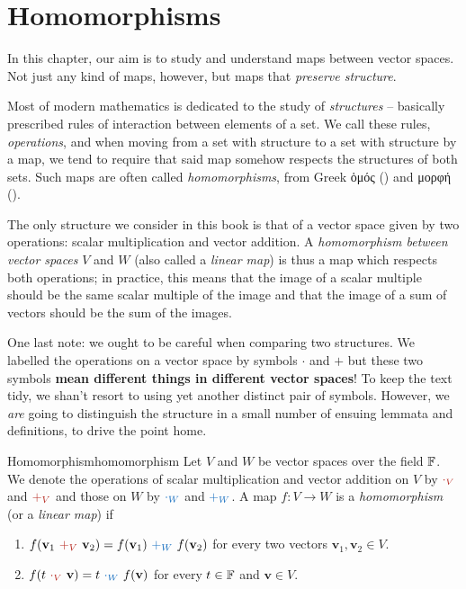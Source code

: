 \chapter{Homomorphisms}
\label{chap:homomorphisms}

In this chapter, our aim is to study and understand maps between vector spaces.
Not just any kind of maps, however, but maps that \emph{preserve structure}.

Most of modern mathematics is dedicated to the study of \emph{structures} --
basically prescribed rules of interaction between elements of a set. We call
these rules, \emph{operations}, and when moving from a set with structure to a
set with structure by a map, we tend to require that said map somehow respects
the structures of both sets. Such maps are often called \emph{homomorphisms},
from Greek ὁμός () and μορφή ().

The only structure we consider in this book is that of a vector space given by
two operations: scalar multiplication and vector addition. A \emph{homomorphism
between vector spaces} $V$ and $W$ (also called a \emph{linear map}) is thus a
map which respects both operations; in practice, this means that the image of a
scalar multiple should be the same scalar multiple of the image and that the
image of a sum of vectors should be the sum of the images.

One last note: we ought to be careful when comparing two structures. We labelled
the operations on a vector space by symbols $ \cdot $ and $+$ but these two
symbols \textbf{mean different things in different vector spaces}! To keep the
text tidy, we shan't resort to using yet another distinct pair of symbols.
However, we \emph{are} going to distinguish the structure in a small number of
ensuing lemmata and definitions, to drive the point home.

\begin{definition}{Homomorphism}{homomorphism}
 Let $V$ and $W$ be vector spaces over the field $\mathbb{F}$. We denote the operations
 of scalar multiplication and vector addition on $V$ by $\clr{ \cdot _V}$ and
 $\clr{ +_V}$ and those on $W$ by $\clb{ \cdot _W}$ and $\clb{+_W}$. A map $f:V
 \to W$ is a \emph{homomorphism} (or a \emph{linear map}) if
 \begin{enumerate}
  \item $f(\mathbf{v}_1~\clr{+_V}~\mathbf{v}_2) =
   f(\mathbf{v}_1)~\clb{+_W}~f(\mathbf{v}_2)$ for every two vectors
   $\mathbf{v}_1,\mathbf{v}_2 \in V$.
  \item $f(t~\clr{ \cdot _V}~\mathbf{v}) = t~\clb{ \cdot_W}~f(\mathbf{v})$ for
   every $t \in \mathbb{F}$ and $\mathbf{v} \in V$.
 \end{enumerate}
\end{definition}

